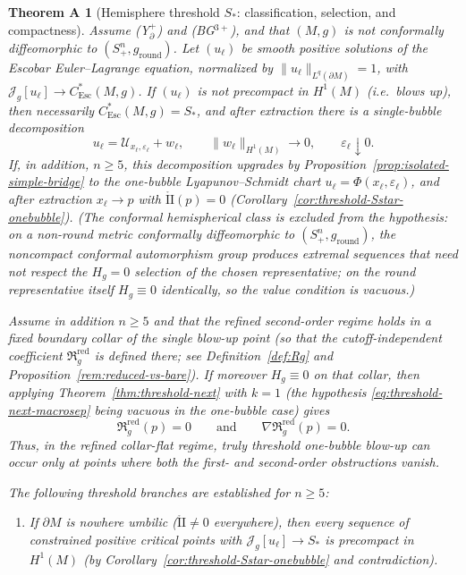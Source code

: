 \documentclass[11pt,reqno,a4paper]{amsart}
\numberwithin{equation}{section}
\theoremstyle{plain}
\newcommand{\Esc}{\ensuremath{\mathrm{Esc}}}
\theoremstyle{remark}
\theoremstyle{plain}
\newtheorem*{thmA}{Theorem A}
\begin{document}
\begin{thmA}[Hemisphere threshold $S_\ast$: classification, selection, and compactness]\label{thm:intro-threshold}
Assume \textup{(Y$^+_{\partial}$)} and \textup{(BG$^{3+}$)}, and that $(M,g)$ is not conformally diffeomorphic
to $(S^n_+,g_{\mathrm{round}})$.
Let $(u_\ell)$ be smooth positive solutions of the Escobar Euler--Lagrange equation, normalized by $\|u_\ell\|_{L^q(\partial M)}=1$,
with $\mathcal J_g[u_\ell]\to C^*_{\Esc}(M,g)$.
If $(u_\ell)$ is not precompact in $H^1(M)$ (i.e.\ blows up),
then necessarily $C^*_{\Esc}(M,g)=S_\ast$, and after extraction there is a single-bubble
decomposition
\[
u_\ell=\mathcal U_{x_\ell,\varepsilon_\ell}+w_\ell,\qquad \|w_\ell\|_{H^1(M)}\to0,\qquad \varepsilon_\ell\downarrow0.
\]
If, in addition, $n\ge5$, this decomposition upgrades by Proposition~\ref{prop:isolated-simple-bridge}
to the one-bubble Lyapunov--Schmidt chart
$u_\ell=\Phi(x_\ell,\varepsilon_\ell)$, and after extraction $x_\ell\to p$ with $\mathring{\mathrm{II}}(p)=0$
(Corollary~\ref{cor:threshold-Sstar-onebubble}).
(The conformal hemispherical class is excluded from the hypothesis: on a non-round metric
conformally diffeomorphic to $(S^n_+,g_{\mathrm{round}})$, the noncompact conformal automorphism
group produces extremal sequences that need not respect the $H_g=0$ selection of the chosen
representative; on the round representative itself $H_g\equiv0$ identically, so the value
condition is vacuous.)

\smallskip
Assume in addition $n\ge 5$ and that the refined second-order regime holds in a fixed boundary collar of the
single blow-up point (so that the cutoff-independent coefficient $\mathfrak R_g^{\mathrm{red}}$ is defined there;
see Definition~\ref{def:Rg} and Proposition~\ref{rem:reduced-vs-bare}).
If moreover $H_g\equiv0$ on that collar, then applying Theorem~\ref{thm:threshold-next} with $k=1$
(the hypothesis \eqref{eq:threshold-next-macrosep} being vacuous in the one-bubble case) gives
\[
\mathfrak R_g^{\mathrm{red}}(p)=0
\qquad\text{and}\qquad
\nabla \mathfrak R_g^{\mathrm{red}}(p)=0.
\]
Thus, in the refined collar-flat regime, truly threshold one-bubble blow-up can occur only at points where both the first- and second-order
obstructions vanish.

\smallskip
The following threshold branches are established for $n\ge5$:
\begin{enumerate}[label=\textup{(\alph*)},leftmargin=1.5em]
\item
If $\partial M$ is nowhere umbilic ($\mathring{\mathrm{II}}\neq0$ everywhere), then every sequence of constrained positive critical points with
$\mathcal J_g[u_\ell]\to S_\ast$ is precompact in $H^1(M)$
\textup{(}by Corollary~\ref{cor:threshold-Sstar-onebubble} and contradiction\textup{)}.


\end{enumerate}
\end{thmA}
\end{document}
